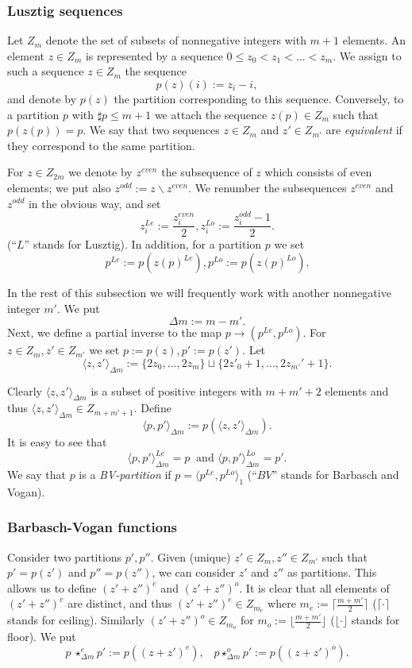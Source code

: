 \documentclass{emsprocart}
\begin{document}
\subsubsection{Lusztig sequences}
Let $Z_m$ denote the set of subsets of nonnegative integers with $m+1$ elements. An element $z\in Z_m$  is represented by a sequence $0\le z_0<z_1<...<z_m$. We assign to such a sequence $z\in Z_m$ the sequence $$p(z)(i):=z_i-i,$$ and denote by $p(z)$ the partition corresponding to this sequence. Conversely, to a partition $p$ with $\sharp p\le m+1$ we attach the sequence $z(p)\in Z_m$ such that $p(z(p))=p$. We say that two sequences $z\in Z_m$ and $z'\in Z_{m'}$ are {\it equivalent} if they correspond to the same partition.

For $z\in Z_{2m}$ we denote by $z^{even}$ the subsequence of $z$ which consists of even elements; we put also $z^{odd}:=z\backslash z^{even}$. We renumber the subsequences $z^{even}$ and $z^{odd}$ in the obvious way, and set  $$z_i^{Le}:=\frac{z^{even}_i}2, z_i^{Lo}:=\frac{z^{odd}_i-1}2.$$(``$L$'' stands for Lusztig). In addition, for a partition $p$ we set $$p^{Le}:=p(z(p)^{Le}), p^{Lo}:=p(z(p)^{Lo}).$$

In the rest of this subsection we will frequently work with another nonnegative integer $m'$. We put $$\Delta m:=m-m'.$$
Next, we define a partial inverse to the map $p\to (p^{Le}, p^{Lo})$. For $z\in Z_m, z'\in Z_{m'}$ we set $p:=p(z), p':=p(z')$. Let
$$\langle z, z'\rangle_{\Delta m} :=\{2z_0,..., 2z_m\}\sqcup\{2z'_0+1,..., 2z_{m'}'+1\}.$$

Clearly $\langle z, z'\rangle_{\Delta m}$ is a subset of positive integers with $m+m'+2$ elements and thus $\langle z, z'\rangle_{\Delta m}\in Z_{m+m'+1}$. Define $$\langle p, p'\rangle_{\Delta m}:=p(\langle z, z'\rangle_{\Delta m}).$$ It is easy to see that$$\langle p, p'\rangle_{\Delta m}^{Le}=p~\mbox{~and~}\langle p, p'\rangle_{\Delta m}^{Lo}=p'.$$ We say that $p$ is a {\it BV-partition} if $p=\langle p^{Le}, p^{Lo}\rangle_1$ (``$BV$'' stands for Barbasch and Vogan).
\subsubsection{Barbasch-Vogan functions} Consider two partitions $p', p''$. Given (unique) $z'\in Z_m, z''\in Z_{m'}$ such that $p'=p(z')$ and $p''=p(z'')$, we can consider $z'$ and $z''$ as partitions. This allows us to define $(z'+z'')^e$ and $(z'+z'')^o$. It is clear that all elements of $(z'+z'')^e$ are distinct, and thus $(z'+z'')^e\in Z_{m_e}$ where $m_e:=\lceil\frac{m+m'}2\rceil$ ($\lceil\cdot\rceil$ stands for ceiling). Similarly $(z'+z'')^o\in Z_{m_o}$ for $m_o:=\lfloor\frac{m+m'}2\rfloor$ ($\lfloor\cdot\rfloor$ stands for floor). We put
$$p~\star^e_{\Delta m}p':=p((z+z')^e),\hspace{10pt} p\star^o_{\Delta m}p':=p((z+z')^o).$$
\end{document}
